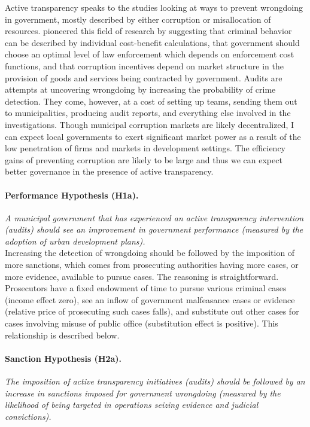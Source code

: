 \documentclass[11pt]{article}
\begin{document}
Active transparency speaks to the studies looking at ways to prevent wrongdoing in government, mostly described by either corruption or misallocation of resources. \citet{BeckerCrimePunishmentEconomic1968,BeckerLawEnforcementMalfeasance1974,Rose-AckermanEconomicsCorruption1975} pioneered this field of research by suggesting that criminal behavior can be described by individual cost-benefit calculations, that government should choose an optimal level of law enforcement which depends on enforcement cost functions, and that corruption incentives depend on market structure in the provision of goods and services being contracted by government. Audits are attempts at uncovering wrongdoing by increasing the probability of crime detection. They come, however, at a cost of setting up teams, sending them out to municipalities, producing audit reports, and everything else involved in the investigations. Though municipal corruption markets are likely decentralized, I can expect local governments to exert significant market power as a result of the low penetration of firms and markets in development settings. The efficiency gains of preventing corruption are likely to be large and thus we can expect better governance in the presence of active transparency.

\paragraph{Performance Hypothesis (H1a).} \emph{A municipal government that has experienced an active transparency intervention (audits) should see an improvement in government performance (measured by the adoption of urban development plans).}\\

Increasing the detection of wrongdoing should be followed by the imposition of more sanctions, which comes from prosecuting authorities having more cases, or more evidence, available to pursue cases. The reasoning is straightforward. Prosecutors have a fixed endowment of time to pursue various criminal cases (income effect zero), see an inflow of government malfeasance cases or evidence (relative price of prosecuting such cases falls), and substitute out other cases for cases involving misuse of public office (substitution effect is positive). This relationship is described below.

\paragraph{Sanction Hypothesis (H2a).} \emph{The imposition of active transparency initiatives (audits) should be followed by an increase in sanctions imposed for government wrongdoing (measured by the likelihood of being targeted in operations seizing evidence and judicial convictions).} \\
\end{document}
